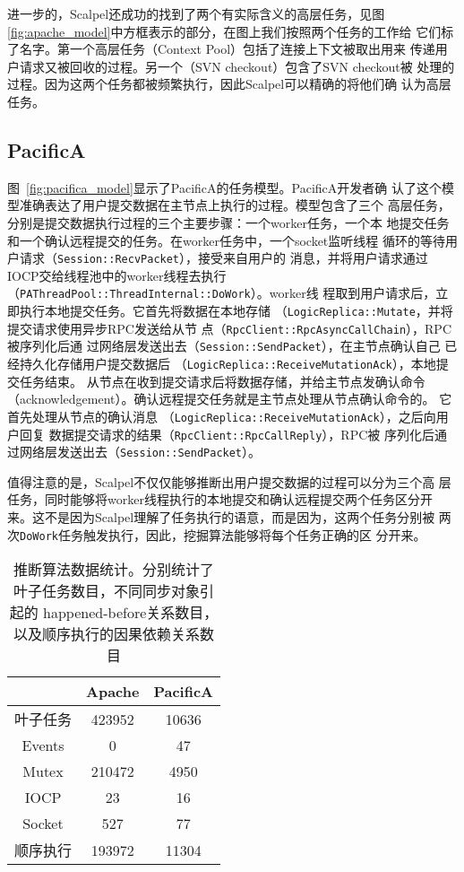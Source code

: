 进一步的，Scalpel还成功的找到了两个有实际含义的高层任务，见图~
\ref{fig:apache_model}中方框表示的部分，在图上我们按照两个任务的工作给
它们标了名字。第一个高层任务（Context Pool）包括了连接上下文被取出用来
传递用户请求又被回收的过程。另一个（SVN checkout）包含了SVN checkout被
处理的过程。因为这两个任务都被频繁执行，因此Scalpel可以精确的将他们确
认为高层任务。

\subsection{PacificA}


图~\ref{fig:pacifica_model}显示了PacificA的任务模型。PacificA开发者确
认了这个模型准确表达了用户提交数据在主节点上执行的过程。模型包含了三个
高层任务，分别是提交数据执行过程的三个主要步骤：一个worker任务，一个本
地提交任务和一个确认远程提交的任务。在worker任务中，一个socket监听线程
循环的等待用户请求（\texttt{Session\-::Recv\-Packet}），接受来自用户的
消息，并将用户请求通过IOCP交给线程池中的worker线程去执行
（\texttt{PA\-Thread\-Pool\-::Thread\-Internal\-::DoWork}）。worker线
程取到用户请求后，立即执行本地提交任务。它首先将数据在本地存储
（\texttt{Logic\-Replica\-::Mutate}，并将提交请求使用异步RPC发送给从节
点（\texttt{Rpc\-Client\-::Rpc\-Async\-Call\-Chain}），RPC被序列化后通
过网络层发送出去（\texttt{Session\-::Send\-Packet}），在主节点确认自己
已经持久化存储用户提交数据后
（\texttt{Logic\-Replica\-::Receive\-MutationAck}），本地提交任务结束。
从节点在收到提交请求后将数据存储，并给主节点发确认命令
（acknowledgement）。确认远程提交任务就是主节点处理从节点确认命令的。
它首先处理从节点的确认消息
（\texttt{Logic\-Replica\-::Receive\-Mutation\-Ack}），之后向用户回复
数据提交请求的结果（\texttt{Rpc\-Client\-::Rpc\-Call\-Reply}），RPC被
序列化后通过网络层发送出去（\texttt{Session\-::Send\-Packet}）。

值得注意的是，Scalpel不仅仅能够推断出用户提交数据的过程可以分为三个高
层任务，同时能够将worker线程执行的本地提交和确认远程提交两个任务区分开
来。这不是因为Scalpel理解了任务执行的语意，而是因为，这两个任务分别被
两次\texttt{DoWork}任务触发执行，因此，挖掘算法能够将每个任务正确的区
分开来。

\begin{table}[htbp]
\small
\centering
\begin{minipage}{0.8\linewidth}
\centering
\caption{推断算法数据统计。分别统计了叶子任务数目，不同同步对象引起的
happened-before关系数目，以及顺序执行的因果依赖关系数目}
\label{fig:statistics}
\begin{tabular}{ccc}

\toprule[1.5pt]
  		& Apache	& PacificA \\
\midrule[1pt]
叶子任务	& 423952	& 10636 \\
Events		& 0			& 47 \\
Mutex 		& 210472	& 4950 \\
IOCP		& 23		& 16 \\
Socket		& 527		& 77 \\
顺序执行	& 193972	& 11304 \\
\bottomrule[1.5pt]
\end{tabular}
\end{minipage}
\end{table}

